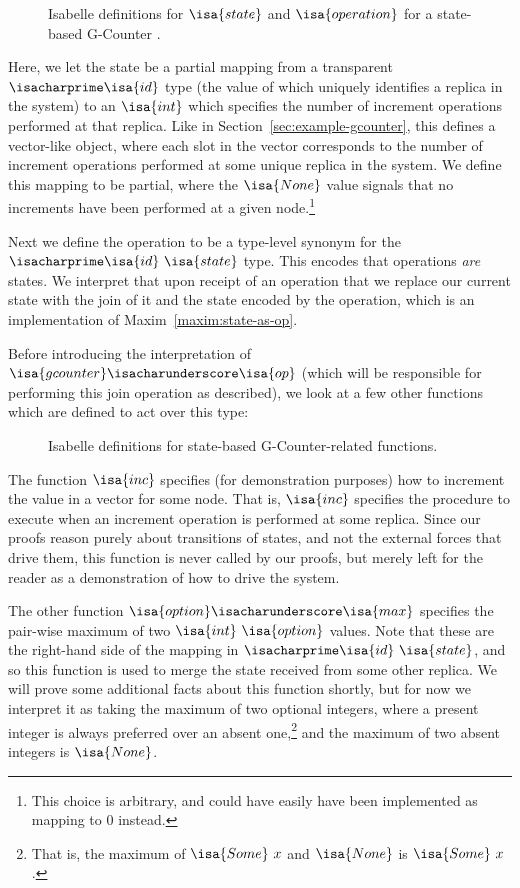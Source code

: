 \begin{figure}[H]
  
  \caption{Isabelle definitions for $\isa{state}$ and $\isa{operation}$ for a
    state-based G-Counter \CRDT.}
\end{figure}

Here, we let the state be a partial mapping from a transparent
$\isacharprime\isa{id}$ type (the value of which uniquely identifies a replica
in the system) to an $\isa{int}$ which specifies the number of increment
operations performed at that replica. Like in
Section~\ref{sec:example-gcounter}, this defines a vector-like object, where
each slot in the vector corresponds to the number of increment operations
performed at some unique replica in the system. We define this mapping to be
partial, where the $\isa{None}$ value signals that no increments have been
performed at a given node.\footnote{This choice is arbitrary, and could have
easily have been implemented as mapping to $0$ instead.}

Next we define the operation to be a type-level synonym for the
$\isacharprime\isa{id}~\isa{state}$ type. This encodes that operations
\emph{are} states. We interpret that upon receipt of an operation that we
replace our current state with the join of it and the state encoded by the
operation, which is an implementation of Maxim~\ref{maxim:state-as-op}.

Before introducing the interpretation of
$\isa{gcounter}\isacharunderscore\isa{op}$ (which will be responsible for
performing this join operation as described), we look at a few other functions
which are defined to act over this type:

\begin{figure}[H]
  
  \caption{Isabelle definitions for state-based G-Counter-related functions.}
  \label{fig:gcounter-option-max}
\end{figure}

The function $\isa{inc}$ specifies (for demonstration purposes) how to increment
the value in a vector for some node. That is, $\isa{inc}$ specifies the
procedure to execute when an increment operation is performed at some replica.
Since our proofs reason purely about transitions of states, and not the external
forces that drive them, this function is never called by our proofs, but merely
left for the reader as a demonstration of how to drive the system.

The other function $\isa{option}\isacharunderscore\isa{max}$ specifies the
pair-wise maximum of two $\isa{int}~\isa{option}$ values. Note that these are
the right-hand side of the mapping in $\isacharprime\isa{id}~\isa{state}$, and
so this function is used to merge the state received from some other replica.
We will prove some additional facts about this function shortly, but for now we
interpret it as taking the maximum of two optional integers, where a present
integer is always preferred over an absent one,\footnote{That is, the maximum of
$\isa{Some}~x$ and $\isa{None}$ is $\isa{Some}~x$.} and the maximum of two
absent integers is $\isa{None}$.

